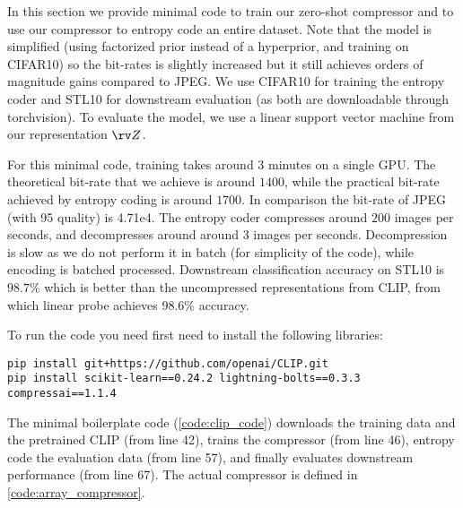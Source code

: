 \documentclass[final]{article}
\begin{document}
In this section we provide minimal code to train our zero-shot compressor and to use our compressor to entropy code an entire dataset.
Note that the model is simplified (\eg using factorized prior instead of a hyperprior, and training on CIFAR10) so the bit-rates is slightly increased but it still achieves orders of magnitude gains compared to JPEG. 
We use CIFAR10 for training the entropy coder and STL10 for downstream evaluation (as both are downloadable through torchvision).
To evaluate the model, we use a linear support vector machine from our representation $\rv Z$.

For this minimal code,
training takes around $3$ minutes on a single GPU.
The theoretical bit-rate that we achieve is around $1400$, while the practical bit-rate achieved by entropy coding is around $1700$.
In comparison the bit-rate of JPEG (with 95 quality) is 4.71e4.
The entropy coder compresses around $200$ images per seconds, and decompresses around around $3$ images per seconds. Decompression is slow as we do not perform it in batch (for simplicity of the code), while encoding is batched processed.
Downstream classification accuracy on STL10 is $98.7 \%$ which is better than the uncompressed representations from CLIP, from which linear probe achieves $98.6 \%$ accuracy.

To run the code you need first need to install the following libraries:
\begin{verbatim}
pip install git+https://github.com/openai/CLIP.git
pip install scikit-learn==0.24.2 lightning-bolts==0.3.3 compressai==1.1.4
\end{verbatim}


The minimal boilerplate code (\cref{code:clip_code}) downloads the training data and the pretrained CLIP (from line 42), trains the compressor (from line 46), entropy code the evaluation data (from line 57), and finally evaluates downstream performance (from line 67).
The actual compressor is defined in \cref{code:array_compressor}.


\clearpage
{} 
\clearpage
{} 
\end{document}
